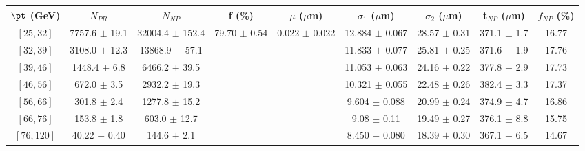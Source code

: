 \begin{tabular}{c||c|c|c|c|c|c|c||c}
$\pt$ (GeV) & $N_{PR}$ & $N_{NP}$ & f (\%) & $\mu$ ($\mu$m) & $\sigma_1$ ($\mu$m) & $\sigma_2$ ($\mu$m)  & t$_{NP}$ ($\mu$m) & $f_{NP}$ (\%) \\
\hline
$[25, 32]$ & 7757.6 $\pm$ 19.1 & 32004.4 $\pm$ 152.4 & \multirow{7}{*}{79.70 $\pm$ 0.54} & \multirow{7}{*}{0.022 $\pm$ 0.022} & 12.884 $\pm$ 0.067 & 28.57 $\pm$ 0.31 & 371.1 $\pm$ 1.7 & 16.77\\
$[32, 39]$ & 3108.0 $\pm$ 12.3 & 13868.9 $\pm$ 57.1 &  &  & 11.833 $\pm$ 0.077 & 25.81 $\pm$ 0.25 & 371.6 $\pm$ 1.9 & 17.76\\
$[39, 46]$ & 1448.4 $\pm$ 6.8 & 6466.2 $\pm$ 39.5 &  &  & 11.053 $\pm$ 0.063 & 24.16 $\pm$ 0.22 & 377.8 $\pm$ 2.9 & 17.73\\
$[46, 56]$ & 672.0 $\pm$ 3.5 & 2932.2 $\pm$ 19.3 &  &  & 10.321 $\pm$ 0.055 & 22.48 $\pm$ 0.26 & 382.4 $\pm$ 3.3 & 17.37\\
$[56, 66]$ & 301.8 $\pm$ 2.4 & 1277.8 $\pm$ 15.2 &  &  & 9.604 $\pm$ 0.088 & 20.99 $\pm$ 0.24 & 374.9 $\pm$ 4.7 & 16.86\\
$[66, 76]$ & 153.8 $\pm$ 1.8 & 603.0 $\pm$ 12.7 &  &  & 9.08 $\pm$ 0.11 & 19.49 $\pm$ 0.27 & 376.1 $\pm$ 8.8 & 15.75\\
$[76, 120]$ & 40.22 $\pm$ 0.40 & 144.6 $\pm$ 2.1 &  &  & 8.450 $\pm$ 0.080 & 18.39 $\pm$ 0.30 & 367.1 $\pm$ 6.5 & 14.67\\
\end{tabular}

